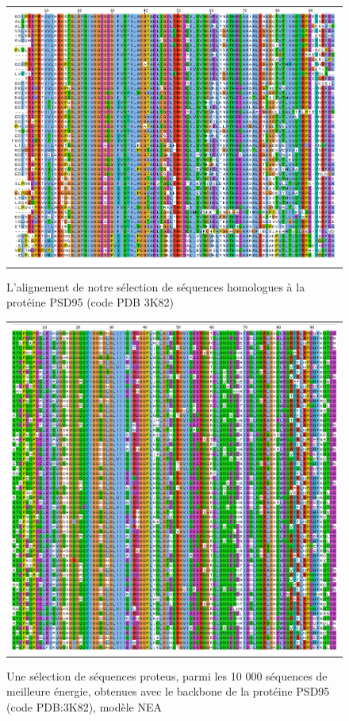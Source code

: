    \begin{figure}[t]
     \centering
     \begin{tabular}{c}
       \includegraphics[width=17cm]{homologues/3K82.png} \\
     \end{tabular}
     \caption{L'alignement de notre sélection de séquences homologues à la protéine PSD95 (code PDB 3K82)}
\label{align_homo:PSD95}
   \end{figure}

   \begin{figure}[t]
     \centering
     \begin{tabular}{c}
       \includegraphics[width=17cm]{proteus/3K82.png} \\
     \end{tabular}
       \caption{Une sélection de séquences proteus, parmi les 10 000 séquences de meilleure énergie, obtenues avec le backbone de la protéine PSD95 (code PDB:3K82), modèle NEA}
\label{align_proteus:PSD95}
   \end{figure}
\clearpage

